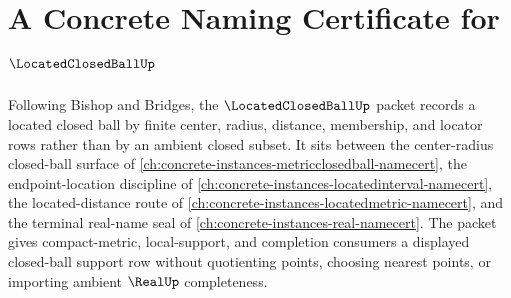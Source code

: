 \chapter{A Concrete Naming Certificate for $\LocatedClosedBallUp$}
\label{ch:concrete-instances-located-closed-ball-namecert}

Following Bishop and Bridges, the $\LocatedClosedBallUp$ packet records a located closed ball by finite center, radius, distance, membership, and locator rows rather than by an ambient closed subset. It sits between the center-radius closed-ball surface of \autoref{ch:concrete-instances-metricclosedball-namecert}, the endpoint-location discipline of \autoref{ch:concrete-instances-locatedinterval-namecert}, the located-distance route of \autoref{ch:concrete-instances-locatedmetric-namecert}, and the terminal real-name seal of \autoref{ch:concrete-instances-real-namecert}. The packet gives compact-metric, local-support, and completion consumers a displayed closed-ball support row without quotienting points, choosing nearest points, or importing ambient $\RealUp$ completeness.


